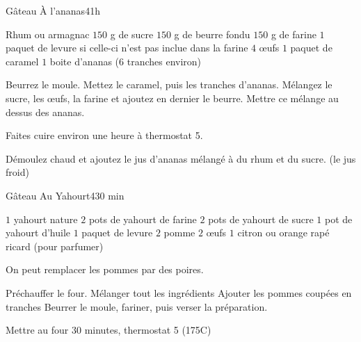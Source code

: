 \begin{recette}{Gâteau À l'ananas}{4}{}{1h}
\begin{ingredients}
\ingredient Rhum ou armagnac
\ingredient $150$ g de sucre
\ingredient $150$ g de beurre fondu
\ingredient $150$ g de farine
\ingredient $1$ paquet de levure si celle-ci n'est pas inclue dans la farine
\ingredient $4$ œufs
\ingredient $1$ paquet de caramel
\ingredient $1$ boite d'ananas ($6$ tranches environ)
\end{ingredients}

\begin{preparation}
\etape Beurrez le moule. Mettez le caramel, puis les tranches d'ananas.
\etape Mélangez le sucre, les œufs, la farine et ajoutez en dernier le beurre.
\etape Mettre ce mélange au dessus des ananas.
\end{preparation}

\begin{cuisson}
Faites cuire environ une heure à thermostat 5.

Démoulez chaud et ajoutez le jus d'ananas mélangé à du rhum et du sucre. (le jus froid)
\end{cuisson}

\end{recette}

\begin{recette}{Gâteau Au Yahourt}{4}{}{30 min}

\begin{ingredients}
\ingredient $1$ yahourt nature
\ingredient $2$ pots de yahourt de farine
\ingredient $2$ pots de yahourt de sucre
\ingredient $1$ pot de yahourt d'huile
\ingredient $1$ paquet de levure
\ingredient $2$ pomme
\ingredient $2$ œufs
\ingredient $1$ citron ou orange rapé
\ingredient ricard (pour parfumer)
\end{ingredients}

\begin{remarque}
On peut remplacer les pommes par des poires.
\end{remarque}

\begin{preparation}
\etape Préchauffer le four.
\etape Mélanger tout les ingrédients
\etape Ajouter les pommes coupées en tranches
\etape Beurrer le moule, fariner, puis verser la préparation.
\end{preparation}

\begin{cuisson}
Mettre au four 30 minutes, thermostat 5 (175\degres C)
\end{cuisson}
\end{recette}

